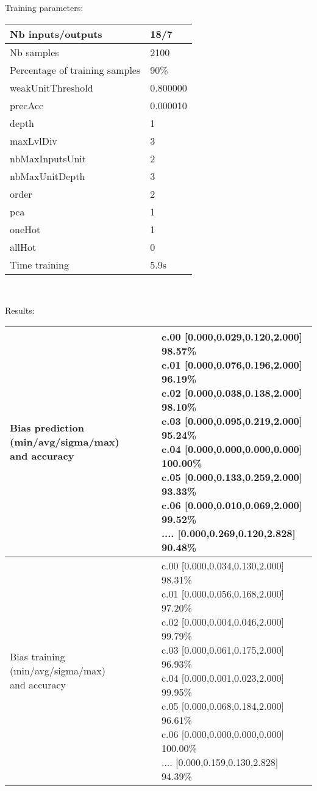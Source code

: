Training parameters:\\
\begin{center}
\begin{tabular}{|l|l|}
\hline
Nb inputs/outputs&18/7\\
\hline
Nb samples&2100\\
\hline
Percentage of training samples&90\%\\
\hline
weakUnitThreshold&0.800000\\
\hline
precAcc&0.000010\\
\hline
depth&1\\
\hline
maxLvlDiv&3\\
\hline
nbMaxInputsUnit&2\\
\hline
nbMaxUnitDepth&3\\
\hline
order&2\\
\hline
pca&1\\
\hline
oneHot&1\\
\hline
allHot&0\\
\hline
Time training&5.9s\\
\hline
\end{tabular}\\
\end{center}\newline
Results:
\begin{center}
\begin{tabular}{|l|l|}
\hline
\makecell{Bias prediction (min/avg/sigma/max)\\and accuracy}&\makecell{c.00 [0.000,0.029,0.120,2.000] 98.57\%\\
c.01 [0.000,0.076,0.196,2.000] 96.19\%\\
c.02 [0.000,0.038,0.138,2.000] 98.10\%\\
c.03 [0.000,0.095,0.219,2.000] 95.24\%\\
c.04 [0.000,0.000,0.000,0.000] 100.00\%\\
c.05 [0.000,0.133,0.259,2.000] 93.33\%\\
c.06 [0.000,0.010,0.069,2.000] 99.52\%\\
.... [0.000,0.269,0.120,2.828] 90.48\%\\
}\\

\hline
\makecell{Bias training (min/avg/sigma/max)\\and accuracy}&\makecell{c.00 [0.000,0.034,0.130,2.000] 98.31\%\\
c.01 [0.000,0.056,0.168,2.000] 97.20\%\\
c.02 [0.000,0.004,0.046,2.000] 99.79\%\\
c.03 [0.000,0.061,0.175,2.000] 96.93\%\\
c.04 [0.000,0.001,0.023,2.000] 99.95\%\\
c.05 [0.000,0.068,0.184,2.000] 96.61\%\\
c.06 [0.000,0.000,0.000,0.000] 100.00\%\\
.... [0.000,0.159,0.130,2.828] 94.39\%\\
}\\
\hline
\end{tabular}\
\end{center}
